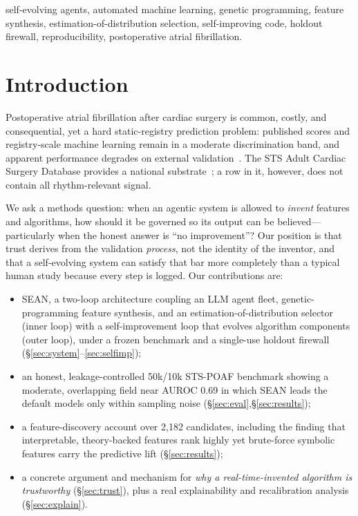 \documentclass[10pt,conference]{IEEEtran}
\newcommand{\sean}{SEAN}
\begin{document}
\begin{IEEEkeywords}
self-evolving agents, automated machine learning, genetic programming, feature synthesis,
estimation-of-distribution selection, self-improving code, holdout firewall, reproducibility,
postoperative atrial fibrillation.
\end{IEEEkeywords}

\section{Introduction}
Postoperative atrial fibrillation after cardiac surgery is common, costly, and consequential,
yet a hard static-registry prediction problem: published scores and registry-scale machine
learning remain in a moderate discrimination band, and apparent performance degrades on
external validation~\cite{mathew2004,mariscalco2014,pollock2018,pandey2023,andrei2024}. The
STS Adult Cardiac Surgery Database provides a national substrate~\cite{stsDatabase}; a row in
it, however, does not contain all rhythm-relevant signal.

We ask a methods question: when an agentic system is allowed to \emph{invent} features and
algorithms, how should it be governed so its output can be believed---particularly when the
honest answer is ``no improvement''? Our position is that trust derives from the validation
\emph{process}, not the identity of the inventor, and that a self-evolving system can satisfy
that bar more completely than a typical human study because every step is logged. Our
contributions are:
\begin{itemize}\itemsep1pt
\item \sean{}, a two-loop architecture coupling an LLM agent fleet, genetic-programming
feature synthesis, and an estimation-of-distribution selector (inner loop) with a
self-improvement loop that evolves algorithm components (outer loop), under a frozen
benchmark and a single-use holdout firewall (\S\ref{sec:system}--\ref{sec:selfimp});
\item an honest, leakage-controlled 50k/10k STS-POAF benchmark showing a moderate, overlapping
field near AUROC 0.69 in which \sean{} leads the default models only within sampling noise
(\S\ref{sec:eval},\S\ref{sec:results});
\item a feature-discovery account over 2{,}182 candidates, including the finding that
interpretable, theory-backed features rank highly yet brute-force symbolic features carry the
predictive lift (\S\ref{sec:results});
\item a concrete argument and mechanism for \emph{why a real-time-invented algorithm is
trustworthy} (\S\ref{sec:trust}), plus a real explainability and recalibration analysis
(\S\ref{sec:explain}).
\end{itemize}
\end{document}
